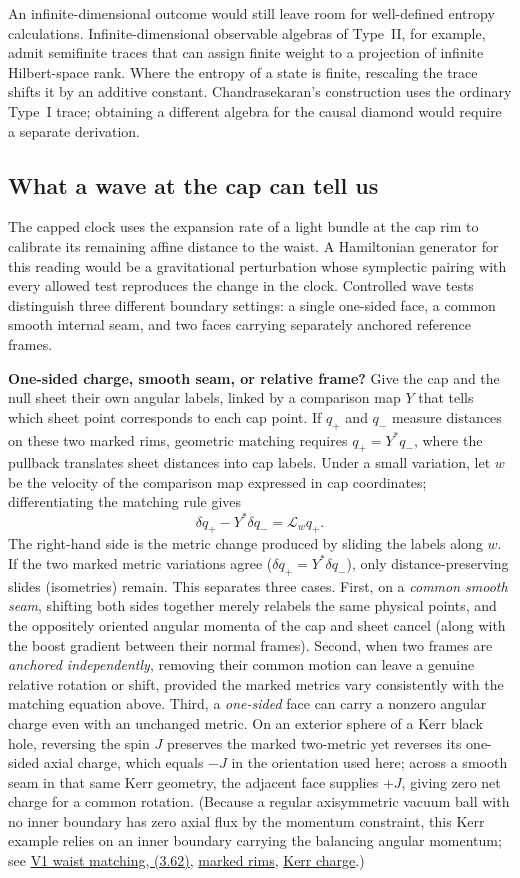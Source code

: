 \documentclass[10pt,a4paper]{article}
\newcommand{\repo}[2]{\href{https://github.com/sprajs/quantum-gravity/blob/main/#1}{#2}}
\begin{document}
An infinite-dimensional outcome would still leave room for well-defined entropy calculations. Infinite-dimensional observable algebras of Type~II, for example, admit semifinite traces that can assign finite weight to a projection of infinite Hilbert-space rank. Where the entropy of a state is finite, rescaling the trace shifts it by an additive constant. Chandrasekaran's construction uses the ordinary Type~I trace; obtaining a different algebra for the causal diamond would require a separate derivation.

\subsection{What a wave at the cap can tell us}
The capped clock uses the expansion rate of a light bundle at the cap rim to calibrate its remaining affine distance to the waist. A Hamiltonian generator for this reading would be a gravitational perturbation whose symplectic pairing with every allowed test reproduces the change in the clock. Controlled wave tests distinguish three different boundary settings: a single one-sided face, a common smooth internal seam, and two faces carrying separately anchored reference frames.

\textbf{One-sided charge, smooth seam, or relative frame?} Give the cap and the null sheet their own angular labels, linked by a comparison map $Y$ that tells which sheet point corresponds to each cap point. If $q_+$ and $q_-$ measure distances on these two marked rims, geometric matching requires $q_+=Y^*q_-$, where the pullback translates sheet distances into cap labels. Under a small variation, let $w$ be the velocity of the comparison map expressed in cap coordinates; differentiating the matching rule gives
\[
   \delta q_+-Y^*\delta q_-=\mathcal L_w q_+ .
\]
The right-hand side is the metric change produced by sliding the labels along $w$. If the two marked metric variations agree ($\delta q_+=Y^*\delta q_-$), only distance-preserving slides (isometries) remain. This separates three cases. First, on a \emph{common smooth seam}, shifting both sides together merely relabels the same physical points, and the oppositely oriented angular momenta of the cap and sheet cancel (along with the boost gradient between their normal frames). Second, when two frames are \emph{anchored independently}, removing their common motion can leave a genuine relative rotation or shift, provided the marked metrics vary consistently with the matching equation above. Third, a \emph{one-sided} face can carry a nonzero angular charge even with an unchanged metric. On an exterior sphere of a Kerr black hole, reversing the spin $J$ preserves the marked two-metric yet reverses its one-sided axial charge, which equals $-J$ in the orientation used here; across a smooth seam in that same Kerr geometry, the adjacent face supplies $+J$, giving zero net charge for a common rotation. (Because a regular axisymmetric vacuum ball with no inner boundary has zero axial flux by the momentum constraint, this Kerr example relies on an inner boundary carrying the balancing angular momentum; see \href{https://arxiv.org/html/2611.34924v1\#S3.E62.1}{V1 waist matching, (3.62)}, \repo{audit/match-reduction.md}{marked rims}, \repo{audit/match-rotation.md}{Kerr charge}.)
\end{document}
